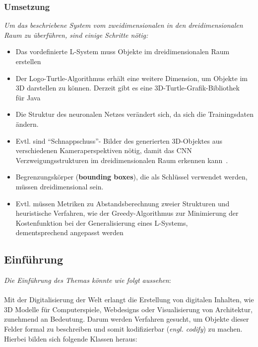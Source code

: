 \documentclass[11pt]{article}
\begin{document}
    \newpage

    \subsubsection{Umsetzung}
    \textit{Um das beschriebene System vom zweidimensionalen in den dreidimensionalen Raum zu überführen, sind einige
    Schritte nötig:}
    \begin{itemize}
        \item Das vordefinierte L-System muss Objekte im dreidimensionalen Raum erstellen
        \item Der Logo-Turtle-Algorithmus erhält eine weitere Dimension, um Objekte im 3D darstellen zu können.
        Derzeit gibt es eine 3D-Turtle-Grafik-Bibliothek~\cite{cheloniidae} für Java
        \item Die Struktur des neuronalen Netzes verändert sich, da sich die Trainingsdaten ändern.
        \item Evtl. sind "`Schnappschuss"'- Bilder des generierten 3D-Objektes aus verschiedenen Kameraperspektiven
        nötig, damit das CNN\\ Verzweigungsstrukturen im dreidimensionalen Raum erkennen kann~\cite{4}.
        \item Begrenzungskörper (\textbf{bounding boxes}), die als Schlüssel verwendet werden, müssen dreidimensional
        sein.
        \item Evtl. müssen Metriken zu Abstandsberechnung zweier Strukturen und heuristische Verfahren, wie der
        Greedy-Algorithmus zur Minimierung der Kostenfunktion bei der Generalisierung eines L-Systems,\\ dementsprechend
        angepasst werden
    \end{itemize}

    \subsection{Einführung}
    \textit{Die Einführung des Themas könnte wie folgt aussehen}:\\~\\
    Mit der Digitalisierung der Welt erlangt die Erstellung von digitalen Inhalten, wie 3D Modelle für Computerspiele,
    Webdesigns oder Visualisierung von Architektur, zunehmend an Bedeutung.
    Darum werden Verfahren gesucht, um Objekte dieser Felder formal zu beschreiben und somit kodifizierbar
    (\textit{engl. codify}) zu machen.
    Hierbei bilden sich folgende Klassen heraus:
\end{document}
